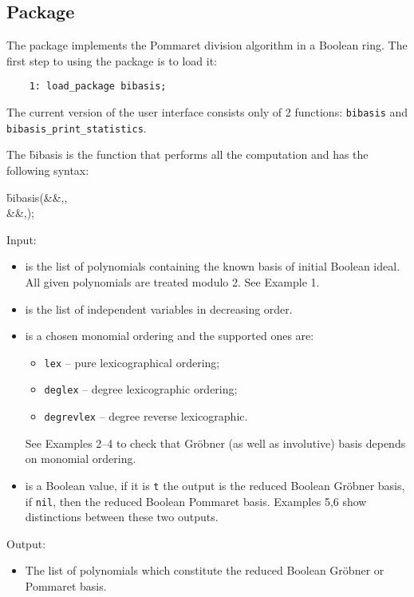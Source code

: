 \subsection{ Package}

The package  implements the Pommaret division algorithm in a Boolean ring. The first step to using the package
is to load it:
\begin{verbatim}
    1: load_package bibasis;
\end{verbatim}
The current version of the  user interface consists only of 2 functions:
\texttt{bibasis} and
\texttt{bibasis\_print\_statistics}.

\hypertarget{operator:BIBASIS}{}
\noindent The \f{bibasis} is the function that performs all the computation and has the following syntax:
\begin{syntaxtable}
  \f{bibasis}(&&,,\\
              &&,);
\end{syntaxtable}
Input:
\begin{itemize}
    \item {} is the list of polynomials containing the known basis of initial
Boolean ideal. All given polynomials are treated modulo 2. See Example 1.

    \item {} is the list of independent variables in decreasing order.

    \item {} is a chosen monomial ordering and the supported ones are:
        \begin{itemize}
            \item[] \texttt{lex} -- pure lexicographical ordering;
            \item[] \texttt{deglex} -- degree lexicographic ordering;
            \item[] \texttt{degrevlex} -- degree reverse lexicographic.
        \end{itemize}
        See Examples 2--4 to check that Gr\"obner (as well as involutive) basis depends on monomial ordering.

    \item {} is a Boolean value, if it is \texttt{t} the output is the reduced
        Boolean Gr\"obner basis, if \texttt{nil}, then the reduced Boolean Pommaret basis. Examples 5,6 show distinctions between these two outputs.
\end{itemize}
Output:
\begin{itemize}
 \item The list of polynomials which constitute the reduced Boolean Gr\"obner or Pommaret basis.
\end{itemize}

